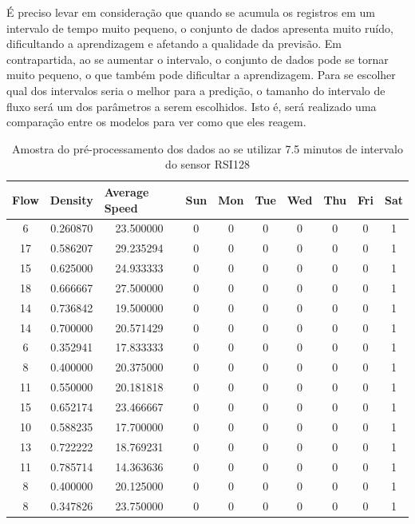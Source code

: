 É preciso levar em consideração que quando se acumula os registros em um intervalo de tempo muito pequeno, o conjunto de dados apresenta muito ruído, dificultando a aprendizagem e afetando a qualidade da previsão. Em contrapartida, ao se aumentar o intervalo, o conjunto de dados pode se tornar muito pequeno, o que também pode dificultar a aprendizagem. Para se escolher qual dos intervalos seria o melhor para a predição, o tamanho do intervalo de fluxo será um dos parâmetros a serem escolhidos. Isto é, será realizado uma comparação entre os modelos para ver como que eles reagem. 

\begin{table}[H]
    \begin{tabular}{cccccccccc}
    \toprule
    \multicolumn{1}{l}{\textbf{Flow}} & \multicolumn{1}{l}{\textbf{Density}} & \multicolumn{1}{l}{\textbf{Average Speed}} & \multicolumn{1}{l}{\textbf{Sun}} &
    \multicolumn{1}{l}{\textbf{Mon}} & \multicolumn{1}{l}{\textbf{Tue}} & \multicolumn{1}{l}{\textbf{Wed}} & \multicolumn{1}{l}{\textbf{Thu}} &
    \multicolumn{1}{l}{\textbf{Fri}} &
    \multicolumn{1}{l}{\textbf{Sat}} \\
    \midrule
     6 & 0.260870 & 23.500000 & 0 & 0 & 0 & 0 & 0 & 0 & 1 \\
    \midrule
    17 & 0.586207 & 29.235294 & 0 & 0 & 0 & 0 & 0 & 0 & 1 \\
    \midrule
    15 & 0.625000 & 24.933333 & 0 & 0 & 0 & 0 & 0 & 0 & 1 \\
    \midrule
    18 & 0.666667 & 27.500000 & 0 & 0 & 0 & 0 & 0 & 0 & 1 \\
    \midrule
    14 & 0.736842 & 19.500000 & 0 & 0 & 0 & 0 & 0 & 0 & 1 \\
    \midrule
    14 & 0.700000 & 20.571429 & 0 & 0 & 0 & 0 & 0 & 0 & 1 \\
    \midrule
     6 & 0.352941 & 17.833333 & 0 & 0 & 0 & 0 & 0 & 0 & 1 \\
    \midrule
     8 & 0.400000 & 20.375000 & 0 & 0 & 0 & 0 & 0 & 0 & 1 \\
    \midrule
    11 & 0.550000 & 20.181818 & 0 & 0 & 0 & 0 & 0 & 0 & 1 \\
    \midrule
    15 & 0.652174 & 23.466667 & 0 & 0 & 0 & 0 & 0 & 0 & 1 \\
    \midrule
    10 & 0.588235 & 17.700000 & 0 & 0 & 0 & 0 & 0 & 0 & 1 \\
    \midrule
    13 & 0.722222 & 18.769231 & 0 & 0 & 0 & 0 & 0 & 0 & 1 \\
    \midrule
    11 & 0.785714 & 14.363636 & 0 & 0 & 0 & 0 & 0 & 0 & 1 \\
    \midrule
     8 & 0.400000 & 20.125000 & 0 & 0 & 0 & 0 & 0 & 0 & 1 \\
    \midrule
     8 & 0.347826 & 23.750000 & 0 & 0 & 0 & 0 & 0 & 0 & 1 \\
    \bottomrule
    \end{tabular}
    \label{table:data_pre}
    \caption{Amostra do pré-processamento dos dados ao se utilizar 7.5 minutos de intervalo do sensor RSI128}
\end{table}

